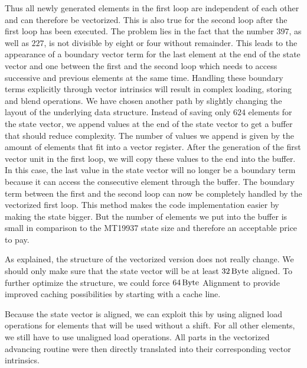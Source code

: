 \documentclass{stdlocal}
\begin{document}
    Thus all newly generated elements in the first loop are independent of each other and can therefore be vectorized.
    This is also true for the second loop after the first loop has been executed.
    The problem lies in the fact that the number $397$, as well as $227$, is not divisible by eight or four without remainder.
    This leads to the appearance of a boundary vector term for the last element at the end of the state vector and one between the first and the second loop which needs to access successive and previous elements at the same time.
    Handling these boundary terms explicitly through vector intrinsics will result in complex loading, storing and blend operations.
    We have chosen another path by slightly changing the layout of the underlying data structure.
    Instead of saving only $624$ elements for the state vector, we append values at the end of the state vector to get a buffer that should reduce complexity.
    The number of values we append is given by the amount of elements that fit into a vector register.
    After the generation of the first vector unit in the first loop, we will copy these values to the end into the buffer.
    In this case, the last value in the state vector will no longer be a boundary term because it can access the consecutive element through the buffer.
    The boundary term between the first and the second loop can now be completely handled by the vectorized first loop.
    This method makes the code implementation easier by making the state bigger.
    But the number of elements we put into the buffer is small in comparison to the MT19937 state size and therefore an acceptable price to pay.

    As explained, the structure of the vectorized version does not really change.
    We should only make sure that the state vector will be at least $32\, \mathrm{Byte}$ aligned.
    To further optimize the structure, we could force $64\, \mathrm{Byte}$ Alignment to provide improved caching possibilities by starting with a cache line.

    Because the state vector is aligned, we can exploit this by using aligned load operations for elements that will be used without a shift.
    For all other elements, we still have to use unaligned load operations.
    All parts in the vectorized advancing routine were then directly translated into their corresponding vector intrinsics.
\end{document}
